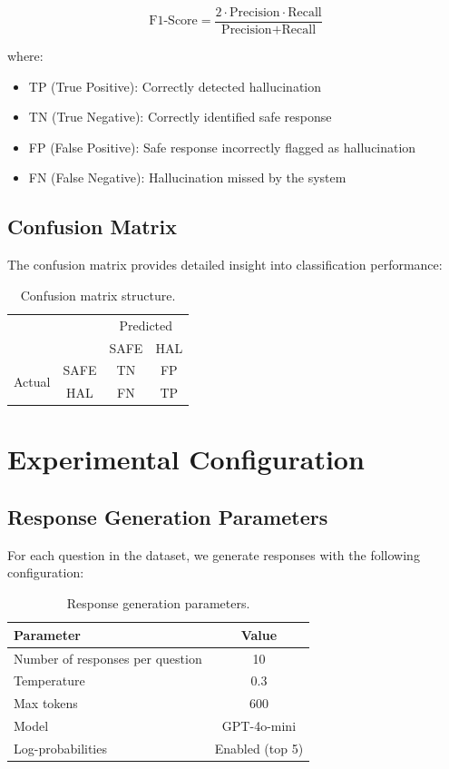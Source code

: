 \begin{equation}
    \text{F1-Score} = \frac{2 \cdot \text{Precision} \cdot \text{Recall}}{\text{Precision} + \text{Recall}}
\end{equation}

where:
\begin{itemize}
    \item TP (True Positive): Correctly detected hallucination
    \item TN (True Negative): Correctly identified safe response
    \item FP (False Positive): Safe response incorrectly flagged as hallucination
    \item FN (False Negative): Hallucination missed by the system
\end{itemize}

\subsection{Confusion Matrix}

The confusion matrix provides detailed insight into classification performance:

\begin{table}[!htbp]
    \centering
    \caption{Confusion matrix structure.}
    \begin{tabular}{cc|cc}
        & & \multicolumn{2}{c}{Predicted} \\
        & & SAFE & HAL \\
        \hline
        \multirow{2}{*}{Actual} & SAFE & TN & FP \\
        & HAL & FN & TP \\
    \end{tabular}
\end{table}

\section{Experimental Configuration}

\subsection{Response Generation Parameters}

For each question in the dataset, we generate responses with the following configuration:

\begin{table}[!htbp]
    \centering
    \caption{Response generation parameters.}
    \label{tab:gen_params}
    \begin{tabular}{lc}
        \toprule
        Parameter & Value \\
        \midrule
        Number of responses per question & 10 \\
        Temperature & 0.3 \\
        Max tokens & 600 \\
        Model & GPT-4o-mini \\
        Log-probabilities & Enabled (top 5) \\
        \bottomrule
    \end{tabular}
\end{table}

